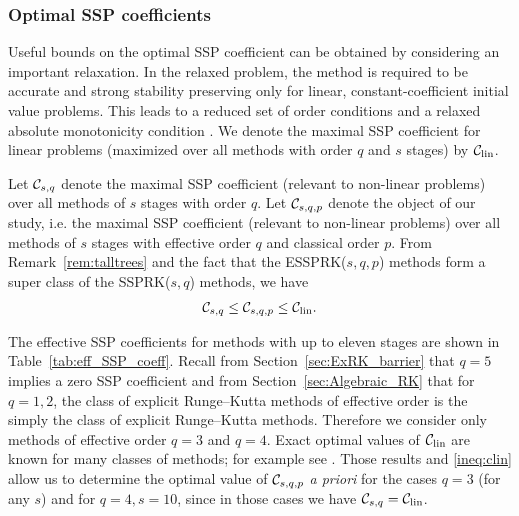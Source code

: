 \subsubsection{Optimal SSP coefficients}\label{subsubsec:optimal_SSP_coeff}
Useful bounds on the optimal SSP coefficient can be obtained 
by considering an important relaxation. 
In the relaxed problem, the method is required to be accurate and strong 
stability preserving only for linear, constant-coefficient initial value problems. 
This leads to a reduced set of order conditions and a relaxed absolute 
monotonicity condition \cite{Kraaijevanger1986,Ketcheson2008,ketcheson2009a}.
We denote the maximal SSP coefficient for linear problems
(maximized over all methods with order $q$ and $s$ stages) by $\mathcal{C}_{\text{lin}}$.

Let $\mathcal{C}_{s,q}$ denote the maximal SSP coefficient (relevant to
non-linear problems) over all methods of $s$ stages with order $q$.  Let
$\mathcal{C}_{s,q,p}$ denote the object of our study, i.e. the maximal SSP
coefficient (relevant to non-linear problems) over all methods of $s$ stages
with effective order $q$ and classical order $p$.
From Remark~\ref{rem:talltrees} and the fact that the ESSPRK($s,q,p$) methods
form a super class of the SSPRK($s,q$) methods, we have
\begin{align} \label{ineq:clin}
        \mathcal{C}_{s,q} \le \mathcal{C}_{s,q,p} \le\mathcal{C}_{\text{lin}}.
\end{align}

The effective SSP coefficients for methods with up to eleven stages are shown in 
Table~\ref{tab:eff_SSP_coeff}.
Recall from Section~\ref{sec:ExRK_barrier} that $q=5$ implies a zero
SSP coefficient and from Section~\ref{sec:Algebraic_RK} that for
$q=1,2$, the class of explicit Runge--Kutta methods of effective order
is the simply the class of explicit Runge--Kutta methods.  %
Therefore we consider only methods of effective order $q=3$ and $q=4$.
Exact optimal values of $\mathcal{C}_{\text{lin}}$ are known for many classes of methods; for
example see \cite{Kraaijevanger1986,Ketcheson2008,ketcheson2009a}.
Those results and \eqref{ineq:clin} allow us to determine the optimal value
of $\mathcal{C}_{s,q,p}$ {\em a priori} for the cases $q=3$ (for any $s$) and
for $q=4,s=10$, since in those cases we have $\mathcal{C}_{s,q}=\mathcal{C}_{\text{lin}}$.

